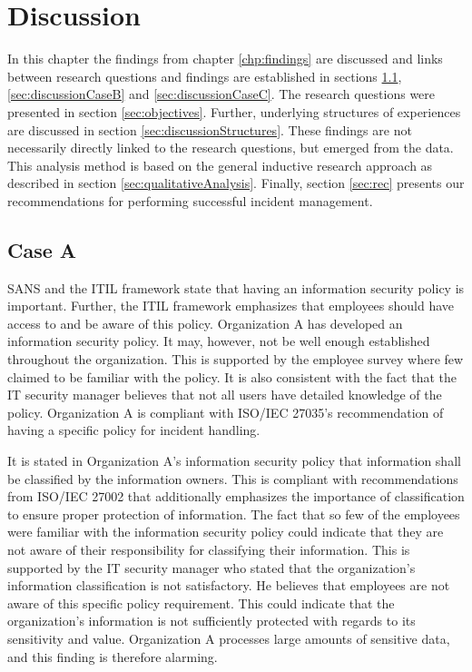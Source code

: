 \chapter{Discussion}
\label{chp:discussion}
In this chapter the findings from chapter \ref{chp:findings} are discussed and links between research questions and findings are established in sections \ref{sec:discussionCaseA}, \ref{sec:discussionCaseB} and \ref{sec:discussionCaseC}. The research questions were presented in section \ref{sec:objectives}. Further, underlying structures of experiences  are discussed in section \ref{sec:discussionStructures}. These findings are not necessarily  directly linked to the research questions, but emerged from the data. This analysis method is based on the general inductive research approach as described in section \ref{sec:qualitativeAnalysis}. Finally, section \ref{sec:rec} presents our recommendations for performing successful incident management.  

\section{Case A}
\label{sec:discussionCaseA}
SANS and the \acs{ITIL} framework state that having an information security policy is important. Further, the \acs{ITIL} framework emphasizes that employees should have access to and be aware of this policy. Organization A has developed an information security policy. It may, however, not be well enough established throughout the organization. This is supported by the employee survey where few claimed to be familiar with the policy. It is also consistent with the fact that the IT security manager believes that not all users have detailed knowledge of the policy. Organization A is compliant with ISO/IEC 27035's recommendation of having a specific policy for incident handling. 

It is stated in Organization A's information security policy that information shall be classified by the information owners. This is compliant with recommendations from ISO/IEC 27002 that additionally emphasizes the importance of classification to ensure proper protection of information. The fact that so few of the employees were familiar with the information security policy could indicate that they are not aware of their responsibility for classifying their information. This is supported by the IT security manager who stated that the organization's information classification is not satisfactory. He believes that employees are not aware of this specific policy requirement. This could indicate that the organization's information is not sufficiently protected with regards to its sensitivity and value. Organization A processes large amounts of sensitive data, and this finding is therefore alarming.

